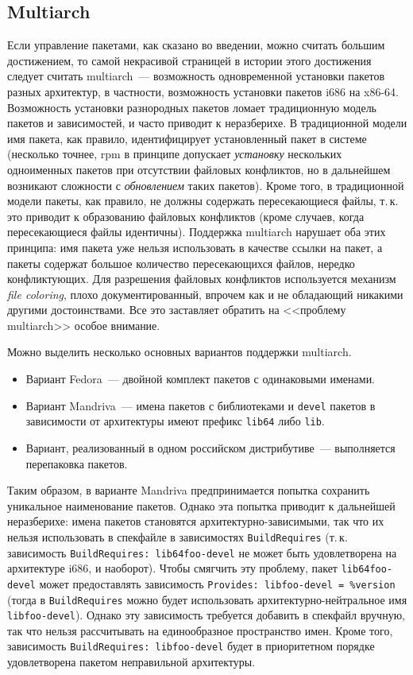 \documentclass[russian,a4paper,12pt,titlepage]{article}
\begin{document}
\subsection{Multiarch}
Если управление пакетами, как сказано во введении, можно считать большим достижением, то самой некрасивой страницей
в истории этого достижения следует считать multiarch~--- возможность одновременной установки пакетов разных архитектур,
в частности, возможность установки пакетов i686 на x86-64.  Возможность установки разнородных пакетов ломает традиционную
модель пакетов и зависимостей, и часто приводит к неразберихе.  В традиционной модели имя пакета, как правило, идентифицирует
установленный пакет в системе (несколько точнее, rpm в принципе допускает \emph{установку} нескольких одноименных пакетов
при отсутствии файловых конфликтов, но в дальнейшем возникают сложности с \emph{обновлением} таких пакетов).  Кроме того,
в традиционной модели пакеты, как правило, не должны содержать пересекающиеся файлы, т.\,к. это приводит к образованию файловых
конфликтов (кроме случаев, когда пересекающиеся файлы идентичны).  Поддержка multiarch нарушает оба этих принципа: имя пакета
уже нельзя использовать в качестве ссылки на пакет, а пакеты содержат большое количество пересекающихся файлов, нередко конфликтующих.
Для разрешения файловых конфликтов используется механизм \emph{file coloring}, плохо документированный, впрочем как и не
обладающий никакими другими достоинствами.  Все это заставляет обратить на <<проблему multiarch>> особое внимание.

Можно выделить несколько основных вариантов поддержки multiarch.
\begin{itemize}
\item Вариант Fedora~--- двойной комплект пакетов с одинаковыми именами.
\item Вариант Mandriva~--- имена пакетов с библиотеками и \verb|devel| пакетов в зависимости от архитектуры
имеют префикс \verb|lib64| либо \verb|lib|.
\item Вариант, реализованный в одном российском дистрибутиве~--- выполняется перепаковка пакетов.
\end{itemize}

Таким образом, в варианте Mandriva предпринимается попытка сохранить уникальное наименование пакетов.  Однако эта
попытка приводит к дальнейшей неразберихе: имена пакетов становятся архитектурно-зависимыми, так что их нельзя
использовать в спекфайле в зависимостях \verb|BuildRequires| (т.\,к. зависимость \texttt{BuildRequires: lib64foo-devel}
не может быть удовлетворена на архитектуре i686, и наоборот).  Чтобы смягчить эту проблему, пакет \verb|lib64foo-devel|
может предоставлять зависимость \verb|Provides: libfoo-devel = %version| (тогда в \verb|BuildRequires| можно будет использовать
архитектурно-нейтральное имя \verb|libfoo-devel|).  Однако эту зависимость требуется добавить в спекфайл вручную,
так что нельзя рассчитывать на единообразное пространство имен.  Кроме того, зависимость \texttt{BuildRequires: libfoo-devel}
будет в приоритетном порядке удовлетворена пакетом неправильной архитектуры.
\end{document}
